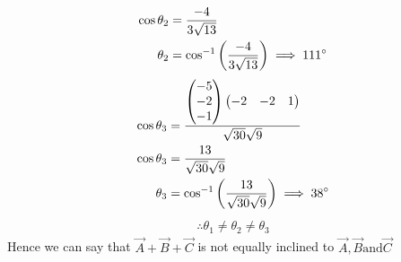 \documentclass[11pt]{book}
\begin{document}
\begin{enumerate}
\begin{align}
    \cos{\theta_2}&=\frac{-4}{3\sqrt{13}}\\
    \theta_2&=\cos^{-1}\left(\frac{-4}{3\sqrt{13}}\right)
    \implies 111\degree
\end{align}
\begin{align}
    \cos{\theta_3}&=\frac{\begin{pmatrix}-5 \\-2 \\-1\end{pmatrix}\begin{pmatrix}-2&-2&1\end{pmatrix}}{\sqrt{30}\sqrt{9}}\\
    \cos{\theta_3}&=\frac{13}{\sqrt{30}\sqrt{9}}\\
    \theta_3&=\cos^{-1}\left(\frac{13}{\sqrt{30}\sqrt{9}}\right)
    \implies 38\degree
\end{align}
\begin{align*}
    \therefore  \theta_1\neq\theta_2\neq\theta_3
\end{align*}
Hence  we can say that $\vec{A}+\vec{B}+\vec{C} $ is not equally inclined to $\vec{A},\vec{B} \text{and} \vec{C}  $ 
\end{enumerate}
\end{document}
